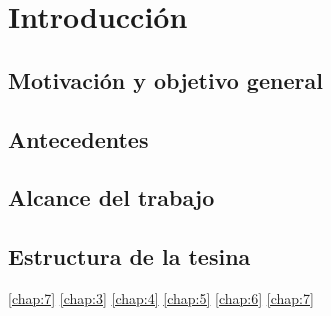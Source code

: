 \chapter{Introducción}
\label{introduccion}

\section{Motivación y objetivo general}
\section{Antecedentes}
\label{sec:antecedentes}
\section{Alcance del trabajo}
\section{Estructura de la tesina}
\ref{chap:7}
\ref{chap:3}
\ref{chap:4}
\ref{chap:5}
\ref{chap:6}
\ref{chap:7}
